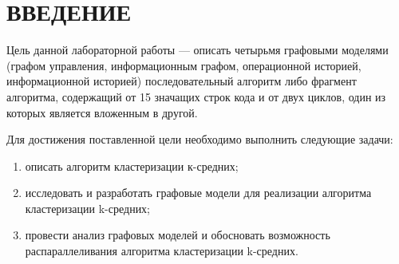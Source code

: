 \chapter*{ВВЕДЕНИЕ}


Цель данной лабораторной работы --- описать четырьмя графовыми моделями (графом управления, информационным графом, операционной историей, информационной историей) последовательный алгоритм либо фрагмент алгоритма, содержащий от 15 значащих строк кода и от двух циклов, один из которых является вложенным в другой.

Для достижения поставленной цели необходимо выполнить следующие задачи:
\begin{enumerate}
	\item описать алгоритм кластеризации к-средних;
	\item исследовать и разработать графовые модели для реализации алгоритма кластеризации k-средних;
	\item провести анализ графовых моделей и обосновать возможность \guillemotleft распараллеливания\guillemotright{} алгоритма кластеризации k-средних.
\end{enumerate}

